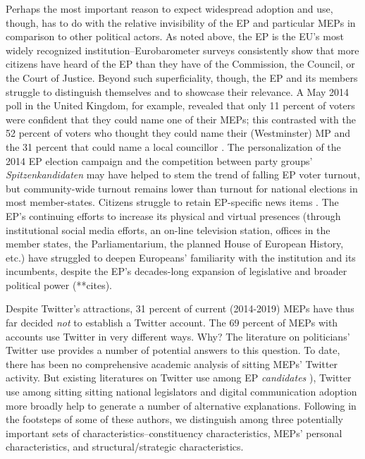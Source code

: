 \documentclass{article}\usepackage[]{graphicx}\usepackage[]{color}
\begin{document}
		Perhaps the most important reason to expect widespread adoption and use, though, has to do with the relative invisibility of the EP and particular MEPs in comparison to other political actors. As noted above, the EP is the EU's most widely recognized institution--Eurobarometer surveys consistently show that more citizens have heard of the EP than they have of the Commission, the Council, or the Court of Justice. Beyond such superficiality, though, the EP and its members struggle to distinguish themselves and to showcase their relevance. A May 2014 poll in the United Kingdom, for example, revealed that only 11 percent of voters were confident that they could name one of their MEPs; this contrasted with the 52 percent of voters who thought they could name their (Westminster) MP and the 31 percent that could name a local councillor \citep*{coman.helm.2014}. The personalization of the 2014 EP election campaign and the competition between party groups' \emph{Spitzenkandidaten} may have helped to stem the trend of falling EP voter turnout, but community-wide turnout remains lower than turnout for national elections in most member-states. Citizens struggle to retain EP-specific news items \citep*{eurobarometer.2013}. The EP's continuing efforts to increase its physical and virtual presences (through institutional social media efforts, an on-line television station, offices in the member states, the Parliamentarium, the planned House of European History, etc.) have struggled to deepen Europeans' familiarity with the institution and its incumbents, despite the EP's decades-long expansion of legislative and broader political power (**cites).
		
		Despite Twitter's attractions, 31 percent of current (2014-2019) MEPs have thus far decided \emph{not} to establish a Twitter account. The 69 percent of MEPs with accounts use Twitter in very different ways. Why? The literature on politicians' Twitter use provides a number of potential answers to this question. To date, there has been no comprehensive academic analysis of sitting MEPs' Twitter activity. But existing literatures on Twitter use among EP \emph{candidates} \citep*{vergeer.hermans.sams.2011,vergeer.hermans.sams.2013}), Twitter use among sitting sitting national legislators \citep*{ausserhofer.maireder.2013, chi.yang.2010, glassman.strauss.shogan.2013, larsson.kalsnes.2014, peterson.2012, shogun.2010, williams.gulati.2010} and digital communication adoption more broadly \citep*{adler.gent.overmeyer.1998, chen.2010, gibson.rommele.2001, gibson.ward.2009, hargittai.2008, hernnson.stokes-brown.hindman.2007, wei.lo.2006} help to generate a number of alternative explanations.  Following in the footsteps of some of these authors, we distinguish among three potentially important sets of characteristics--constituency characteristics, MEPs' personal characteristics, and structural/strategic characteristics.
		
\end{document}
